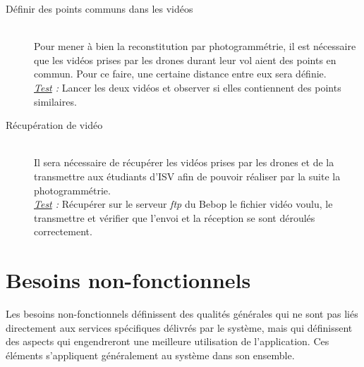 \documentclass[12pt, openany]{report}
\begin{document}
\begin{description}
\item[Définir des points communs dans les vidéos] \hfill \\
Pour mener à bien la reconstitution par photogrammétrie, il est nécessaire que les vidéos prises par les drones durant leur vol aient des points en commun. Pour ce faire, une certaine distance entre eux sera définie. \\
\textit{\underline{Test} :} Lancer les deux vidéos et observer si elles contiennent des points similaires.

\item[Récupération de vidéo] \hfill \\
Il sera nécessaire de récupérer les vidéos prises par les drones et de la transmettre aux étudiants d'ISV afin de pouvoir réaliser par la suite la photogrammétrie. \\
\textit{\underline{Test} :} Récupérer sur le serveur \textit{ftp} du Bebop le fichier vidéo voulu, le transmettre et vérifier que l'envoi et la réception se sont déroulés correctement.


\end{description}


\section{Besoins non-fonctionnels}
Les besoins non-fonctionnels définissent des qualités générales qui ne sont pas liés directement aux services spécifiques délivrés par le système, mais qui définissent des aspects qui engendreront une meilleure utilisation de l'application. Ces éléments s'appliquent généralement au système dans son ensemble.
\end{document}
